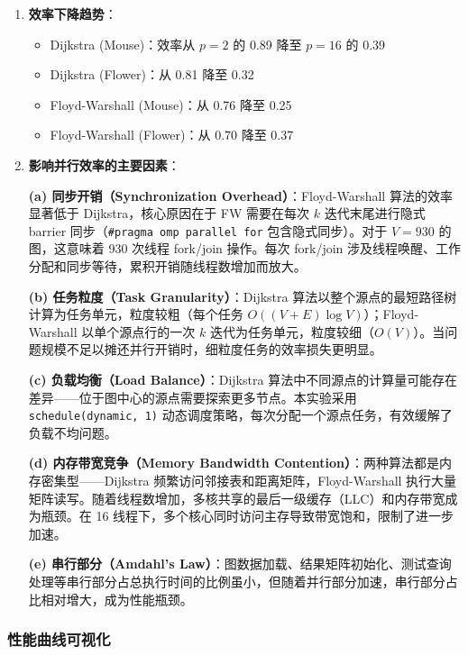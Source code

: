 \documentclass{SYSUReport}
\begin{document}
\begin{enumerate}
    \item \textbf{效率下降趋势}：
    \begin{itemize}
        \item Dijkstra (Mouse)：效率从 $p=2$ 的 0.89 降至 $p=16$ 的 0.39
        \item Dijkstra (Flower)：从 0.81 降至 0.32
        \item Floyd-Warshall (Mouse)：从 0.76 降至 0.25
        \item Floyd-Warshall (Flower)：从 0.70 降至 0.37
    \end{itemize}

    \item \textbf{影响并行效率的主要因素}：

    \textbf{(a) 同步开销（Synchronization Overhead）}：Floyd-Warshall 算法的效率显著低于 Dijkstra，核心原因在于 FW 需要在每次 $k$ 迭代末尾进行隐式 barrier 同步（\texttt{\#pragma omp parallel for} 包含隐式同步）。对于 $V=930$ 的图，这意味着 930 次线程 fork/join 操作。每次 fork/join 涉及线程唤醒、工作分配和同步等待，累积开销随线程数增加而放大。

    \textbf{(b) 任务粒度（Task Granularity）}：Dijkstra 算法以整个源点的最短路径树计算为任务单元，粒度较粗（每个任务 $O((V+E)\log V)$）；Floyd-Warshall 以单个源点行的一次 $k$ 迭代为任务单元，粒度较细（$O(V)$）。当问题规模不足以摊还并行开销时，细粒度任务的效率损失更明显。

    \textbf{(c) 负载均衡（Load Balance）}：Dijkstra 算法中不同源点的计算量可能存在差异——位于图中心的源点需要探索更多节点。本实验采用 \texttt{schedule(dynamic, 1)} 动态调度策略，每次分配一个源点任务，有效缓解了负载不均问题。

    \textbf{(d) 内存带宽竞争（Memory Bandwidth Contention）}：两种算法都是内存密集型——Dijkstra 频繁访问邻接表和距离矩阵，Floyd-Warshall 执行大量矩阵读写。随着线程数增加，多核共享的最后一级缓存（LLC）和内存带宽成为瓶颈。在 16 线程下，多个核心同时访问主存导致带宽饱和，限制了进一步加速。

    \textbf{(e) 串行部分（Amdahl's Law）}：图数据加载、结果矩阵初始化、测试查询处理等串行部分占总执行时间的比例虽小，但随着并行部分加速，串行部分占比相对增大，成为性能瓶颈。
\end{enumerate}

\subsubsection{性能曲线可视化}
\end{document}
